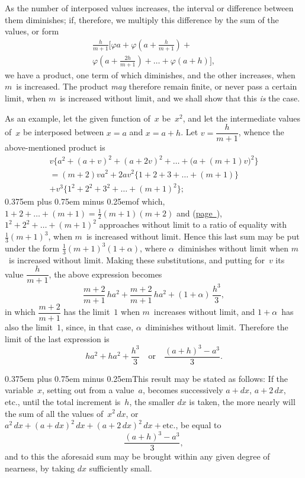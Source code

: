 \documentclass[12pt]{book}[2005/09/16]
\newcommand{\Chg}[2]{#2}
\newcommand{\Add}[1]{\Chg{}{#1}}
\newcommand{\Loosen}{\spaceskip 0.375em plus 0.75em minus 0.25em}
\newcommand{\Pagelabel}[1]{\phantomsection\label{page:#1}}
\newcommand{\PageSep}[1]{\Pagelabel{#1}\ignorespaces}
\newcommand{\PageRef}[2][page]{\hyperref[page:#2]{#1~\pageref*{page:#2}}}
\renewcommand{\etc}{\text{etc}}
\renewcommand{\(}{{\upshape(}}
\renewcommand{\)}{{\upshape)}}
\renewcommand{\phi}{\varphi}
\begin{document}
As the number of interposed values increases, the
interval or difference between them diminishes; if,
therefore, we multiply this difference by the sum of
the values, or form
\begin{multline*}
\frac{h}{m + 1} \Biggl[
  \phi a + \phi\left(a + \frac{h}{m + 1}\right) + \\
  \phi\left(a + \frac{2h}{m + 1}\right) \Add{+} \dots + \phi(a + h)
\Biggr]\Add{,}
\end{multline*}
we have a product, one term of which diminishes, and
the other increases, when $m$~is increased. The product
\emph{may} therefore remain finite, or never pass a certain
limit, when $m$~is increased without limit, and we
shall show that this \emph{is} the case.

As an example, let the given function of~$x$ be~$x^{2}$,
and let the intermediate values of~$x$ be interposed between
$x = a$ and $x = a + h$. Let $v = \dfrac{h}{m + 1}$, whence
the above-mentioned product is
\begin{multline*}%
v\bigl\{a^{2} + (a + v)^{2} + (a + 2v)^{2} + \dots
  + \bigl(a + (m + 1)v\bigr)^{2}\bigr\} \\
  = (m + 2)va^{2} + 2av^{2} \{1 + 2 + 3 + \dots + (m + 1)\} \\
  + v^{3} \{1^{2} + 2^{2} + 3^{2} + \dots + (m + 1)^{2}\};
\end{multline*}
{\Loosen of which, $1 + 2 + \dots + (m + 1) = \frac{1}{2}(m + 1)(m + 2)$
and (\PageRef{73}), $1^{2} + 2^{2} + \dots + (m + 1)^{2}$ approaches
without limit to a ratio of equality with $\frac{1}{3}(m + 1)^{3}$,
when $m$~is increased without limit. Hence this last
sum may be put under the form $\frac{1}{3}(m + 1)^{3} (1 + \alpha)$,
\PageSep{119}
where $\alpha$~diminishes without limit when $m$~is increased
without limit. Making these substitutions, and putting
for~$v$ its value $\dfrac{h}{m + 1}$, the above expression becomes}
\[
\frac{m + 2}{m + 1}\, ha^{2} + \frac{m + 2}{m + 1}\, ha^{2}
  + (1 + \alpha)\, \frac{h^{3}}{3},
\]
in which $\dfrac{m + 2}{m + 1}$ has the limit~$1$ when $m$~increases without
limit, and $1 + \alpha$~has also the limit~$1$, since, in that
case, $\alpha$~diminishes without limit. Therefore the limit
of the last expression is
\[
ha^{2} + ha^{2} + \frac{h^{3}}{3} \quad\text{or}\quad \frac{(a + h)^{3} - a^{3}}{3}.
\]

{\Loosen This result may be stated as follows: If the variable~$x$,
setting out from a value~$a$, becomes successively
$a + dx$, $a + 2\,dx$, etc., until the total increment
is~$h$, the smaller $dx$ is taken, the more nearly will the
sum of all the values of~$x^{2}\, dx$, or $a^{2}\, dx + (a + dx)^{2}\, dx + (a + 2\, dx)^{2}\, dx + \etc.$,
be equal to}
\[
\frac{(a + h)^{3} - a^{3}}{3},
\]
and to this the aforesaid sum may be brought within
any given degree of nearness, by taking $dx$ sufficiently
small.
\end{document}
